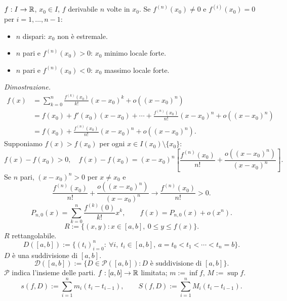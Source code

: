 $f:I\to\mathbb R$, $x_0\in I$, $f$ derivabile $n$ volte in $x_0$.
Se $f^{(n)}(x_0)\ne0$ e $f^{(i)}(x_0)=0$ per $i=1,\ldots,n-1$:
\begin{itemize}\item $n$ dispari: $x_0$ non è estremale.
\item $n$ pari e $f^{(n)}(x_0)>0$: $x_0$ minimo locale forte.
\item $n$ pari e $f^{(n)}(x_0)<0$: $x_0$ massimo locale forte.\end{itemize}
\textit{Dimostrazione.}
\begin{align*}
f(x)&=\sum_{k=0}^n\frac{f^{(k)}(x_0)}{k!}(x-x_0)^k+o((x-x_0)^n)\\
&=f(x_0)+f'(x_0)(x-x_0)+\cdots+\frac{f^{(n)}(x_0)}{n!}(x-x_0)^n+o((x-x_0)^n)\\
&=f(x_0)+\frac{f^{(n)}(x_0)}{n!}(x-x_0)^n+o((x-x_0)^n).
\end{align*}
Supponiamo $f(x)>f(x_0)$ per ogni $x\in I(x_0)\setminus\{x_0\}$:
\[f(x)-f(x_0)>0,\quad
f(x)-f(x_0)=(x-x_0)^n\left[\frac{f^{(n)}(x_0)}{n!}+\frac{o((x-x_0)^n)}{(x-x_0)^n}\right].\]
Se $n$ pari, $(x-x_0)^n>0$ per $x\ne x_0$ e
\[\frac{f^{(n)}(x_0)}{n!}+\frac{o((x-x_0)^n)}{(x-x_0)^n}\longrightarrow\frac{f^{(n)}(x_0)}{n!}>0.\]
\[P_{n,0}(x)=\sum_{k=0}^n\frac{f^{(k)}(0)}{k!}x^k,\qquad f(x)=P_{n,0}(x)+o(x^n).\]
\[R:=\{(x,y):x\in[a,b],\ 0\le y\le f(x)\}.\]
$R$ rettangolabile.
\[D([a,b]):=\{(t_i)_{i=0}^n:\ \forall i,\ t_i\in[a,b],\ a=t_0<t_1<\cdots<t_n=b\}.\]
$D$ è una suddivisione di $[a,b]$.
\[\mathcal D([a,b]):=\{D\in\mathcal P([a,b]):D\text{ è suddivisione di }[a,b]\}.\]
$\mathcal P$ indica l'insieme delle parti. $f:[a,b]\to\mathbb R$ limitata; $m:=\inf f$, $M:=\sup f$.
\[s(f,D):=\sum_{i=1}^n m_i(t_i-t_{i-1}),\qquad S(f,D):=\sum_{i=1}^n M_i(t_i-t_{i-1}).\]
\begin{center}\end{center}
